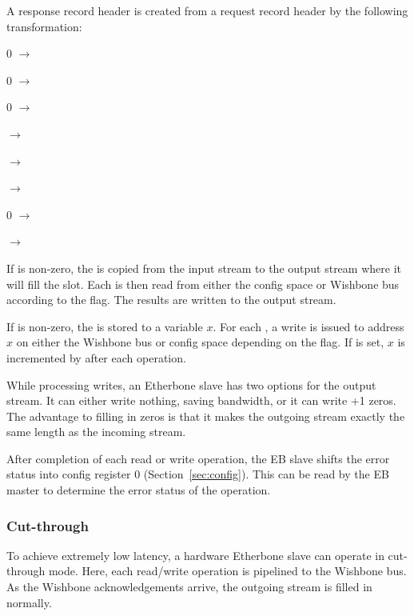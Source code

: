 \documentclass{article}
\newenvironment{packed_itemize}{
\begin{itemize}
  \setlength{\itemsep}{1pt}
  \setlength{\parskip}{0pt}
  \setlength{\parsep}{0pt}
}{\end{itemize}}
\begin{document}
A response record header is created from a request record header by the
following transformation:
\begin{packed_itemize}
\item 0 $\to$ 
\item 0 $\to$ 
\item 0 $\to$ 
\item {} $\to$ 
\item {} $\to$ 
\item {} $\to$ 
\item 0 $\to$ 
\item {} $\to$ 
\end{packed_itemize}

If  is non-zero,
the  is copied from the input stream to the
output stream where it will fill the  slot.
Each  is then read from either the config space or
Wishbone bus according to the  flag.
The results are written to the output stream.

If  is non-zero,
the  is stored to a variable $x$.
For each , 
a write is issued to address $x$ on either the Wishbone bus or config space
depending on the  flag.
If  is set, 
$x$ is incremented by  after each operation.

While processing writes,
an Etherbone slave has two options for the output stream.
It can either write nothing, saving bandwidth,
or it can write +1 zeros.
The advantage to filling in zeros is that it makes the outgoing stream exactly
the same length as the incoming stream.

After completion of each read or write operation,
the EB slave shifts the error status into config register 0
(Section~\ref{sec:config}).
This can be read by the EB master to determine the error status of the
operation.

\subsubsection{Cut-through}
\label{sec:cut}

To achieve extremely low latency,
a hardware Etherbone slave can operate in cut-through mode.
Here, 
each read/write operation is pipelined to the Wishbone bus.
As the Wishbone acknowledgements arrive,
the outgoing stream is filled in normally.
\end{document}
